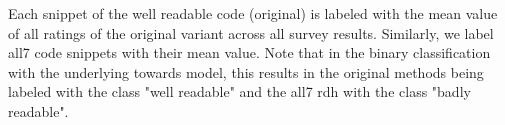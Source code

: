 \documentclass[%
class=scrreprt,
chapterprefix=false,%
open=right,%
twoside=false,%
paper=a4,%
logofile={Logo\_zentral\_farbig\_EN.png},%
thesistype=master,%
UKenglish,%
]{se2thesis}
\newcounter{urlfootnote}
\newcommand{\onecurl}[2]{%
	\stepcounter{urlfootnote}%
	\expandafter\def\csname urlfootnote:#1\endcsname{\theurlfootnote}%
	\footnote{\label{url:#1}\url{#1}, accessed: #2}%
}
\newcommand{\curl}[2]{%
	\ifcsdef{urlfootnote:#1}{%
		\textsuperscript{\ref{url:#1}}%
	}{%
		\onecurl{#1}{#2}%
	}%
}
\theoremstyle{definition}
\begin{document}
	Each snippet of the well readable code (original) is labeled with the mean value of all ratings of the original variant across all survey results. Similarly, we label all7 code snippets with their mean value. Note that in the binary classification with the underlying towards model, this results in the original methods being labeled with the class "well readable" and the all7 rdh with the class "badly readable".
	
	
%	
%	
%	
%	
\end{document}
